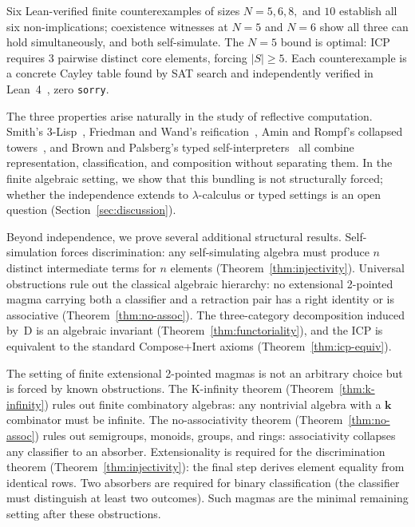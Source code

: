 \documentclass[sigconf,screen,review,anonymous]{acmart}
\theoremstyle{remark}
\begin{document}
Six Lean-verified finite counterexamples of sizes $N\!=\!5, 6, 8,$ and $10$ establish all six non-implications; coexistence witnesses at $N\!=\!5$ and $N\!=\!6$ show all three can hold simultaneously, and both self-simulate. The $N\!=\!5$ bound is optimal: ICP requires 3 pairwise distinct core elements, forcing $|S| \geq 5$. Each counterexample is a concrete Cayley table found by SAT search and independently verified in Lean~4~\cite{moura21}, zero \texttt{sorry}.

The three properties arise naturally in the study of reflective computation. Smith's 3-Lisp~\cite{smith84}, Friedman and Wand's reification~\cite{friedman84}, Amin and Rompf's collapsed towers~\cite{amin18}, and Brown and Palsberg's typed self-interpreters~\cite{brown16} all combine representation, classification, and composition without separating them. In the finite algebraic setting, we show that this bundling is not structurally forced; whether the independence extends to $\lambda$-calculus or typed settings is an open question (Section~\ref{sec:discussion}).

Beyond independence, we prove several additional structural results. Self-simulation forces discrimination: any self-simulating algebra must produce $n$ distinct intermediate terms for $n$ elements (Theorem~\ref{thm:injectivity}). Universal obstructions rule out the classical algebraic hierarchy: no extensional 2-pointed magma carrying both a classifier and a retraction pair has a right identity or is associative (Theorem~\ref{thm:no-assoc}). The three-category decomposition induced by~D is an algebraic invariant (Theorem~\ref{thm:functoriality}), and the ICP is equivalent to the standard Compose+Inert axioms (Theorem~\ref{thm:icp-equiv}).

The setting of finite extensional 2-pointed magmas is not an arbitrary choice but is forced by known obstructions. The K-infinity theorem (Theorem~\ref{thm:k-infinity}) rules out finite combinatory algebras: any nontrivial algebra with a $\mathbf{k}$ combinator must be infinite. The no-associativity theorem (Theorem~\ref{thm:no-assoc}) rules out semigroups, monoids, groups, and rings: associativity collapses any classifier to an absorber. Extensionality is required for the discrimination theorem (Theorem~\ref{thm:injectivity}): the final step derives element equality from identical rows. Two absorbers are required for binary classification (the classifier must distinguish at least two outcomes). Such magmas are the minimal remaining setting after these obstructions.
\end{document}
